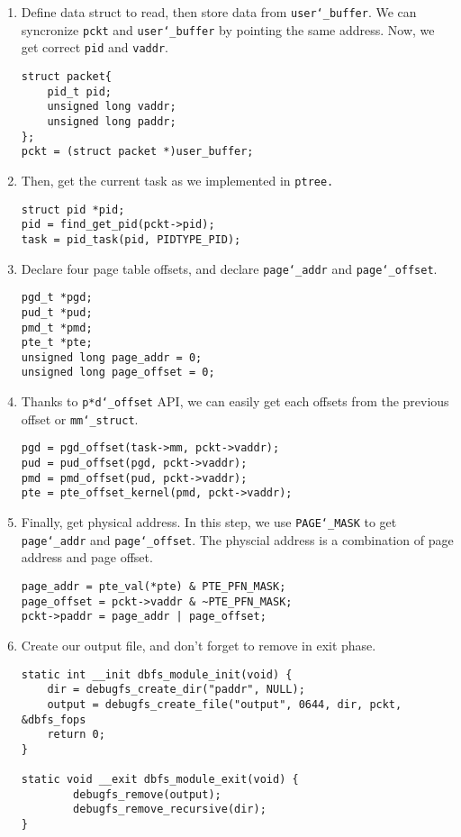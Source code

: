 \begin{enumerate}
\item Define data struct to read, then store data from \texttt{user\char`_buffer}.
We can syncronize \texttt{pckt} and \texttt{user\char`_buffer} by pointing the same address.
Now, we get correct \texttt{pid} and \texttt{vaddr}.
\begin{lstlisting}
struct packet{
    pid_t pid;
    unsigned long vaddr;
    unsigned long paddr;
};
pckt = (struct packet *)user_buffer;
\end{lstlisting}

\item Then, get the current task as we implemented in \texttt{ptree.}
\begin{lstlisting}
struct pid *pid;
pid = find_get_pid(pckt->pid);
task = pid_task(pid, PIDTYPE_PID);
\end{lstlisting}

\item Declare four page table offsets, and declare \texttt{page\char`_addr} and \texttt{page\char`_offset}.
\begin{lstlisting}
pgd_t *pgd;
pud_t *pud;
pmd_t *pmd;
pte_t *pte;
unsigned long page_addr = 0;
unsigned long page_offset = 0;
\end{lstlisting}

\item Thanks to \texttt{p*d\char`_offset} API, we can easily get each offsets from the previous offset or \texttt{mm\char`_struct}.
\begin{lstlisting}
pgd = pgd_offset(task->mm, pckt->vaddr);
pud = pud_offset(pgd, pckt->vaddr);
pmd = pmd_offset(pud, pckt->vaddr);
pte = pte_offset_kernel(pmd, pckt->vaddr);
\end{lstlisting}

\item Finally, get physical address.
In this step, we use \texttt{PAGE\char`_MASK} to get \texttt{page\char`_addr} and \texttt{page\char`_offset}.
The physcial address is a combination of page address and page offset.
\begin{lstlisting}
page_addr = pte_val(*pte) & PTE_PFN_MASK;
page_offset = pckt->vaddr & ~PTE_PFN_MASK;
pckt->paddr = page_addr | page_offset;
\end{lstlisting}

\item Create our output file, and don't forget to remove in exit phase.
\begin{lstlisting}
static int __init dbfs_module_init(void) {
    dir = debugfs_create_dir("paddr", NULL);
    output = debugfs_create_file("output", 0644, dir, pckt, &dbfs_fops
    return 0;
}

static void __exit dbfs_module_exit(void) {
		debugfs_remove(output);
		debugfs_remove_recursive(dir);
}

\end{lstlisting}


\end{enumerate}
